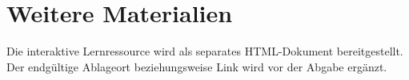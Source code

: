 
\chapter{Weitere Materialien}\label{weitere-materialien}

Die interaktive Lernressource wird als separates HTML-Dokument
bereitgestellt. Der endgültige Ablageort beziehungsweise Link wird vor
der Abgabe ergänzt.
